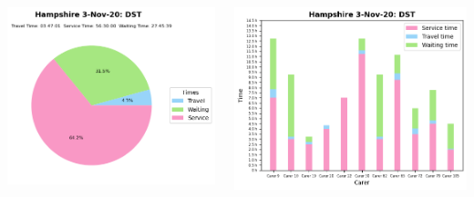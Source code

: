 \documentclass[usenames,dvipsnames]{beamer}
\begin{document}
\begin{frame}
\begin{columns}
\begin{minipage}[c][0.45\textheight][c]{\linewidth}
		\end{minipage}
		\begin{minipage}[c][0.45\textheight][c]{\linewidth}
			\centering
			\includegraphics[width=1\linewidth]{figures/3_Nov_20_Hampshire_time_info_dst}
		\end{minipage}
		\begin{minipage}[c][0.45\textheight][c]{\linewidth}
			\vspace{5mm}
			\centering
			\includegraphics[width=1\linewidth]{figures/3_Nov_20_Hampshire_workload_dst}
		\end{minipage}
	\end{columns}
\end{frame}
\end{document}
